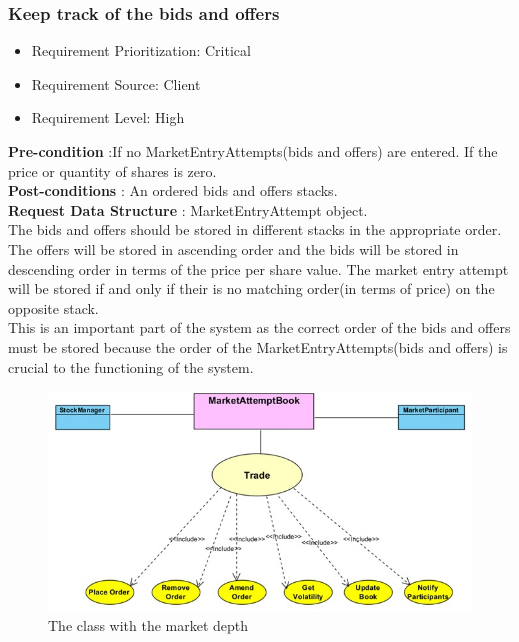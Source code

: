 \documentclass[12pt]{article}
\begin{document}
				\subsubsection{Keep track of the bids and offers}
						\begin{itemize}
							\item Requirement Prioritization: Critical
							\item Requirement Source: Client 
							\item Requirement Level: High	
						\end{itemize}
						
						\textbf{Pre-condition} :If no MarketEntryAttempts(bids and offers) are entered.
						If the price or quantity of shares is zero.\\ 
						\textbf{Post-conditions} : An ordered bids and offers stacks.\\ 
						\textbf{Request Data Structure} : MarketEntryAttempt object.\\
						
						The bids and offers should be stored in different stacks in the appropriate order. The offers will be stored in ascending order and the  bids will be stored in descending order in terms of the price per share value. The market entry attempt will be stored if and only if their is no matching order(in terms of price) on the opposite stack.\\
						
						This is an important part of the system as the correct order of the bids and offers must be stored because the order of the MarketEntryAttempts(bids and offers) is crucial to the functioning of the system.
						
						\begin{figure}[th]
									\centering
									\includegraphics[scale=0.6]{./USE_CASE_Market_Attempt_Book_Financial_Market_Simulator}
									\caption{The class with the market depth}
									\label{domain objects}
						\end{figure}
												
\end{document}
